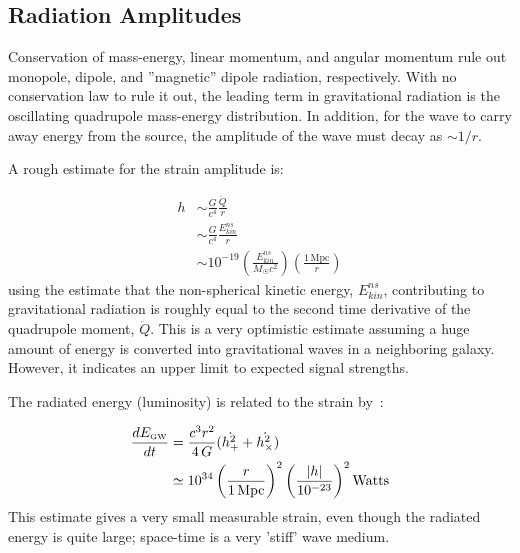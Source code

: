 \subsection{Radiation Amplitudes}

Conservation of mass-energy, linear momentum, and angular momentum rule out 
monopole, dipole, and ''magnetic'' dipole radiation, respectively. With no
conservation law to rule it out, the leading term in gravitational
radiation is the oscillating quadrupole mass-energy distribution. In
addition, for the wave to carry away energy from the source, the amplitude
of the wave must decay as $\sim 1/r$.

A rough estimate for the strain amplitude is\cite{Kip:300}:

\begin{equation}
\begin{aligned}
h &\sim \frac{G}{c^4}\frac{\ddot{Q}}{r} \\
  &\sim \frac{G}{c^4}\frac{E_{kin}^{ns}}{r} \\
  &\sim 10^{-19} \left(\frac{E_{kin}^{ns}}{M_{\astrosun} c^2}\right)
                    \left(\frac{1 \, \mbox{Mpc}}{r}\right)
\end{aligned}
\label{eq:h_estimate}
\end{equation}
using the estimate that the non-spherical kinetic energy, $E_{kin}^{ns}$,
contributing to gravitational radiation is roughly equal to the second
time derivative of the quadrupole moment, $\ddot{Q}$. This is a very
optimistic estimate assuming a huge amount of energy is converted into
gravitational waves in a neighboring galaxy. However,
it indicates an upper limit to expected signal strengths. 

The radiated energy (luminosity) is related to the strain by~\cite{Landau:Fields}:

\begin{equation}
\begin{aligned}
\frac{dE_{\mbox{\tiny GW}}}{dt} &= \frac{c^3 r^2}{4 \, G} 
                      (\dot{h_{+}^2} + \dot{h_{\times}^2}) \\
                   &\simeq 10^{34} \left(\frac{r}{1 \, \mbox{Mpc}}\right)^2
                                   \left(\frac{|h|}{10^{-23}}\right)^2 
                     \mbox{Watts}
\label{eq:Luminosity}
\end{aligned}
\end{equation}
This estimate gives a very small measurable strain, even though the radiated
energy is quite large; space-time is a very 'stiff' wave medium.


